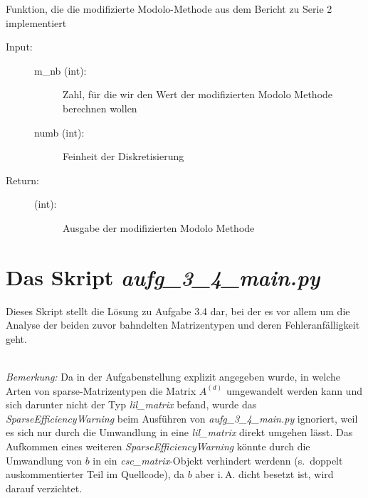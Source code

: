 \documentclass[letterpaper,10pt,ngerman, oneside, openright]{sphinxmanual}
\begin{document}
\begin{fulllineitems}
\label{\detokenize{index:aufg_3_2u3_main.modo}}
Funktion, die die modifizierte Modolo-Methode aus dem Bericht zu Serie 2 implementiert
\begin{description}
\item [{Input:}] \leavevmode
\begin{description}
\item[{m\_nb (int):}] \leavevmode
Zahl, für die wir den Wert der modifizierten Modolo Methode berechnen wollen

\item[{numb (int):}] \leavevmode
Feinheit der Diskretisierung

\end{description}\end{description}
\begin{description}
\item[{Return:}] \leavevmode\begin{description}
\item[{(int):}] \leavevmode
Ausgabe der modifizierten Modolo Methode

\end{description}

\end{description}

\end{fulllineitems}



\section{Das Skript \textit{aufg\_3\_4\_main.py}}

\label{\detokenize{index:module-aufg_3_4_main}}
Dieses Skript stellt die Lösung zu Aufgabe 3.4 dar, bei der es vor allem um die Analyse
der beiden zuvor bahndelten Matrizentypen und deren Fehleranfälligkeit geht.

~\\
\emph{Bemerkung:} Da in der Aufgabenstellung explizit angegeben wurde, in welche Arten von sparse-Matrizentypen die Matrix $A^{(d)}$ umgewandelt werden kann und sich darunter nicht der Typ \textit{lil\_matrix} befand, wurde das \textit{SparseEfficiencyWarning} beim Ausführen von \textit{aufg\_3\_4\_main.py} ignoriert, weil es sich nur durch die Umwandlung in eine \textit{lil\_matrix} direkt umgehen lässt. Das Aufkommen eines weiteren \textit{SparseEfficiencyWarning} könnte durch die Umwandlung von $b$ in ein \textit{csc\_matrix}-Objekt verhindert werdenn (s.~doppelt auskommentierter Teil im Quellcode), da $b$ aber i.\,A. dicht besetzt ist, wird darauf verzichtet.
\end{document}
